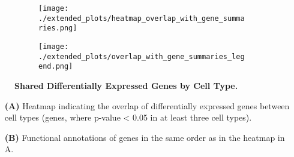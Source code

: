 \begin{figure}[H] 
    \begin{subfigure}[t]{0.2\textwidth}
        \caption{}
        \texttt{[image: ./extended\_plots/heatmap\_overlap\_with\_gene\_summaries.png]}        
    \end{subfigure}   
    \begin{subfigure}[t]{0.8\textwidth}
        \caption{}
        \vspace{1cm}
        \texttt{[image: ./extended\_plots/overlap\_with\_gene\_summaries\_legend.png]}        
    \end{subfigure}   
    \caption{
        \textbf{Shared Differentially Expressed Genes by Cell Type.}\\
    }
    \label{fig:snRNAseq_gene_scores_2}
\end{figure}
\begin{itemize}
    \item[\textbf{(A)}] Heatmap indicating the overlap of differentially expressed genes between cell types (genes, where p-value < 0.05 in at least three cell types). 
    \item[\textbf{(B)}] Functional annotations of genes in the same order as in the heatmap in A.
\end{itemize}
